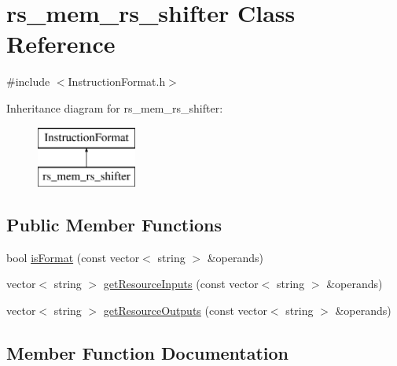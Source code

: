 \hypertarget{classrs__mem__rs__shifter}{}\section{rs\+\_\+mem\+\_\+rs\+\_\+shifter Class Reference}
\label{classrs__mem__rs__shifter}


{\ttfamily \#include $<$Instruction\+Format.\+h$>$}

Inheritance diagram for rs\+\_\+mem\+\_\+rs\+\_\+shifter\+:\begin{figure}[H]
\begin{center}
\leavevmode
\includegraphics[height=2.000000cm]{classrs__mem__rs__shifter}
\end{center}
\end{figure}
\subsection*{Public Member Functions}
\begin{DoxyCompactItemize}
\item 
bool \hyperlink{classrs__mem__rs__shifter_a8499ed65e4e65d8ffc0a15f4216de118}{is\+Format} (const vector$<$ string $>$ \&operands)
\item 
vector$<$ string $>$ \hyperlink{classrs__mem__rs__shifter_a90b19d41406d19856f18fb7f96bf415c}{get\+Resource\+Inputs} (const vector$<$ string $>$ \&operands)
\item 
vector$<$ string $>$ \hyperlink{classrs__mem__rs__shifter_a798cbf0eeae065cffc3acf44a01b2221}{get\+Resource\+Outputs} (const vector$<$ string $>$ \&operands)
\end{DoxyCompactItemize}


\subsection{Member Function Documentation}
\mbox{\label{classrs__mem__rs__shifter_a90b19d41406d19856f18fb7f96bf415c}} 
